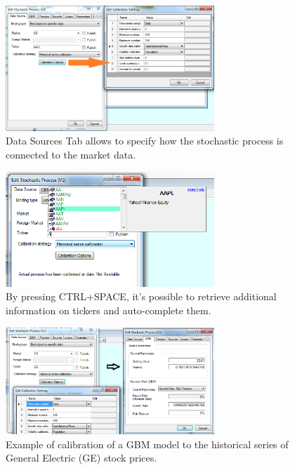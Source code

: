 \begin{figure}[h]
\begin{center}
\includegraphics[width=0.7\textwidth]{./Figures/DataSourcesTab.png}
\caption{Data Sources Tab allows to specify how the stochastic process is connected to the market data.}
\label{fig.DataSourceTab}
\end{center}
\end{figure}

\begin{figure}[h]
\begin{center}
\includegraphics[width=0.7\textwidth]{./Figures/Autocomplete.png}
\caption{By pressing CTRL+SPACE, it's possible to retrieve additional information on tickers and auto-complete them.}
\label{fig.DataSourceTab}
\end{center}
\end{figure}


\begin{figure}[h]
\begin{center}
\includegraphics[width=0.7\textwidth]{./Figures/HistoricalCalibration.png}
\caption{Example of calibration of a GBM model to the historical series of General Electric (GE) stock prices.}
\label{fig.DataSourceTab}
\end{center}
\end{figure}





